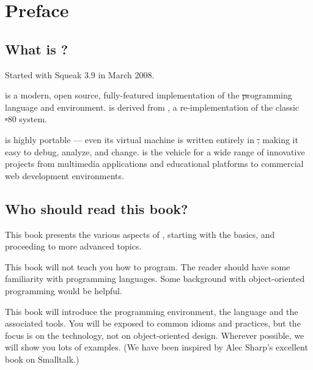 \documentclass[a4paper,10pt,twoside]{book}
\begin{document}
	\sloppy
	\frontmatter
\fi
\chapter{Preface}\label{cha:intro}

\section*{What is \pharo?}



Started with Squeak 3.9 in March 2008.

\pharo is a modern, open source, fully-featured implementation of the \st programming language and environment. \pharo is derived from \squeak, a re-implementation of the classic \st-80 system.


\pharo is highly portable --- even its virtual machine is written entirely in \st, making it easy to debug, analyze, and change. \pharo is the vehicle for a wide range of innovative projects from multimedia applications and educational platforms to commercial web development environments. 

\section*{Who should read this book?}

This book presents the various aspects of \pharo, starting with the basics, and proceeding to more advanced topics.

This book will not teach you how to program. The reader should have some familiarity with programming languages. Some background with object-oriented programming would be helpful.

This book will introduce the \pharo programming environment, the language and the associated tools.  You will be exposed to common idioms and practices, but the focus is on the technology, not on object-oriented design. Wherever possible, we will show you lots of examples. (We have been inspired by Alec Sharp's excellent book on Smalltalk\cite{Shar97a}.)
\end{document}
